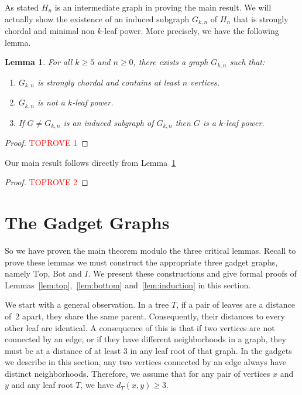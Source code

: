 \documentclass[11pt,letter]{article}
\newtheorem{lemma}[theorem]{Lemma}
\theoremstyle{remark}
\newcommand{\T}{\text{Top}}
\newcommand{\B}{\text{Bot}}
\begin{document}
As stated $H_n$ is an intermediate graph in proving the main result. 
We will actually show the existence
of an induced subgraph $G_{k,n}$ of $H_n$
that is strongly chordal and minimal non $k$-leaf power.
More precisely, we have the following lemma.

\begin{lemma}\label{lem:Gn}
    For all $k\geq 5$ and $n\geq 0$, there exists a graph $G_{k,n}$ such that:
\begin{enumerate}
    \item $G_{k,n}$ is strongly chordal and contains at least $n$ vertices.
    \item $G_{k,n}$ is not a $k$-leaf power.
    \item If $G\neq G_{k,n}$ is an induced subgraph of $G_{k,n}$ then $G$ is a $k$-leaf power.
\end{enumerate}
\end{lemma}
\begin{proof}\textcolor{red}{TOPROVE 1}\end{proof}

Our main result follows directly from Lemma~\ref{lem:Gn}

\begin{proof}\textcolor{red}{TOPROVE 2}\end{proof}





\section{The Gadget Graphs}\label{sec:gadgets}

So we have proven the main theorem modulo the three critical lemmas.
Recall to prove these lemmas we must construct the appropriate three gadget graphs, namely $\T$, $\B$ and $I$.
We present these constructions and give formal proofs of 
Lemmas~\ref{lem:top},~\ref{lem:bottom} and~\ref{lem:induction} in this section.

We start with a general observation. In a tree $T$, if a pair of leaves are a distance of~$2$ apart, they share the same parent. Consequently, their distances to every other leaf are identical. A consequence of this is that if two vertices are not connected by an edge, or if they have different neighborhoods in a graph, they must be at a distance of at least $3$ in any leaf root of that graph. In the gadgets we describe in this section, any two vertices connected by an edge always have distinct neighborhoods. Therefore, we assume that for any pair of vertices $x$ and $y$ and any leaf root $T$, we have $d_T(x, y) \geq 3$.
\end{document}
